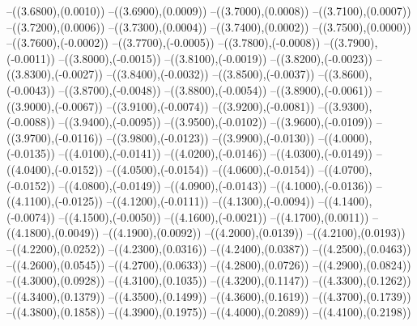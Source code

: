 {	--({\sx*(3.6800)},{\sy*(0.0010)})
	--({\sx*(3.6900)},{\sy*(0.0009)})
	--({\sx*(3.7000)},{\sy*(0.0008)})
	--({\sx*(3.7100)},{\sy*(0.0007)})
	--({\sx*(3.7200)},{\sy*(0.0006)})
	--({\sx*(3.7300)},{\sy*(0.0004)})
	--({\sx*(3.7400)},{\sy*(0.0002)})
	--({\sx*(3.7500)},{\sy*(0.0000)})
	--({\sx*(3.7600)},{\sy*(-0.0002)})
	--({\sx*(3.7700)},{\sy*(-0.0005)})
	--({\sx*(3.7800)},{\sy*(-0.0008)})
	--({\sx*(3.7900)},{\sy*(-0.0011)})
	--({\sx*(3.8000)},{\sy*(-0.0015)})
	--({\sx*(3.8100)},{\sy*(-0.0019)})
	--({\sx*(3.8200)},{\sy*(-0.0023)})
	--({\sx*(3.8300)},{\sy*(-0.0027)})
	--({\sx*(3.8400)},{\sy*(-0.0032)})
	--({\sx*(3.8500)},{\sy*(-0.0037)})
	--({\sx*(3.8600)},{\sy*(-0.0043)})
	--({\sx*(3.8700)},{\sy*(-0.0048)})
	--({\sx*(3.8800)},{\sy*(-0.0054)})
	--({\sx*(3.8900)},{\sy*(-0.0061)})
	--({\sx*(3.9000)},{\sy*(-0.0067)})
	--({\sx*(3.9100)},{\sy*(-0.0074)})
	--({\sx*(3.9200)},{\sy*(-0.0081)})
	--({\sx*(3.9300)},{\sy*(-0.0088)})
	--({\sx*(3.9400)},{\sy*(-0.0095)})
	--({\sx*(3.9500)},{\sy*(-0.0102)})
	--({\sx*(3.9600)},{\sy*(-0.0109)})
	--({\sx*(3.9700)},{\sy*(-0.0116)})
	--({\sx*(3.9800)},{\sy*(-0.0123)})
	--({\sx*(3.9900)},{\sy*(-0.0130)})
	--({\sx*(4.0000)},{\sy*(-0.0135)})
	--({\sx*(4.0100)},{\sy*(-0.0141)})
	--({\sx*(4.0200)},{\sy*(-0.0146)})
	--({\sx*(4.0300)},{\sy*(-0.0149)})
	--({\sx*(4.0400)},{\sy*(-0.0152)})
	--({\sx*(4.0500)},{\sy*(-0.0154)})
	--({\sx*(4.0600)},{\sy*(-0.0154)})
	--({\sx*(4.0700)},{\sy*(-0.0152)})
	--({\sx*(4.0800)},{\sy*(-0.0149)})
	--({\sx*(4.0900)},{\sy*(-0.0143)})
	--({\sx*(4.1000)},{\sy*(-0.0136)})
	--({\sx*(4.1100)},{\sy*(-0.0125)})
	--({\sx*(4.1200)},{\sy*(-0.0111)})
	--({\sx*(4.1300)},{\sy*(-0.0094)})
	--({\sx*(4.1400)},{\sy*(-0.0074)})
	--({\sx*(4.1500)},{\sy*(-0.0050)})
	--({\sx*(4.1600)},{\sy*(-0.0021)})
	--({\sx*(4.1700)},{\sy*(0.0011)})
	--({\sx*(4.1800)},{\sy*(0.0049)})
	--({\sx*(4.1900)},{\sy*(0.0092)})
	--({\sx*(4.2000)},{\sy*(0.0139)})
	--({\sx*(4.2100)},{\sy*(0.0193)})
	--({\sx*(4.2200)},{\sy*(0.0252)})
	--({\sx*(4.2300)},{\sy*(0.0316)})
	--({\sx*(4.2400)},{\sy*(0.0387)})
	--({\sx*(4.2500)},{\sy*(0.0463)})
	--({\sx*(4.2600)},{\sy*(0.0545)})
	--({\sx*(4.2700)},{\sy*(0.0633)})
	--({\sx*(4.2800)},{\sy*(0.0726)})
	--({\sx*(4.2900)},{\sy*(0.0824)})
	--({\sx*(4.3000)},{\sy*(0.0928)})
	--({\sx*(4.3100)},{\sy*(0.1035)})
	--({\sx*(4.3200)},{\sy*(0.1147)})
	--({\sx*(4.3300)},{\sy*(0.1262)})
	--({\sx*(4.3400)},{\sy*(0.1379)})
	--({\sx*(4.3500)},{\sy*(0.1499)})
	--({\sx*(4.3600)},{\sy*(0.1619)})
	--({\sx*(4.3700)},{\sy*(0.1739)})
	--({\sx*(4.3800)},{\sy*(0.1858)})
	--({\sx*(4.3900)},{\sy*(0.1975)})
	--({\sx*(4.4000)},{\sy*(0.2089)})
	--({\sx*(4.4100)},{\sy*(0.2198)})
}
